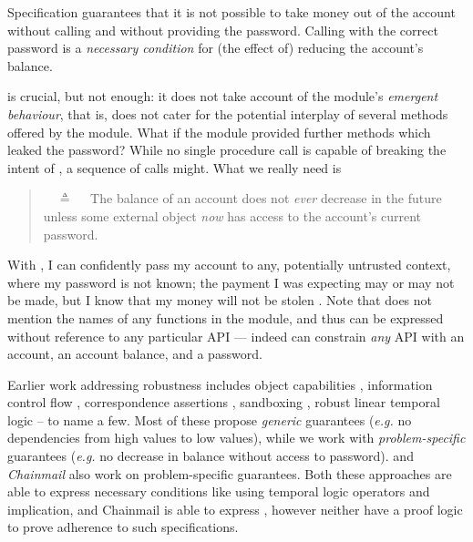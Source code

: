 Specification \SrobustA %
{guarantees} that it is not possible to  take money out of the account 
{without calling  and} without providing the password.
  Calling    with the  correct password is 
a \emph{necessary condition} for {(the effect of)} reducing the account's  balance.

\SrobustA is  crucial, but  not   enough:
it does not take  account of the module's \emph{emergent behaviour},
{that is, does not cater for the potential interplay of several methods offered by the module.}
 What if the module provided further methods which leaked the password?  
{ While no single procedure call is capable of breaking the intent of \SrobustA, a sequence of calls might.}
{What} we really need is
 \begin{quote}
\SrobustB\ \ $\triangleq$ \ \ The balance of an account does not {\emph{ever}} decrease in the future unless some external 
object  {\emph{now}} has access to the account's current password.
\end{quote}
With \SrobustB, I can confidently pass my account to  {any, potentially untrusted context, where my password is not known;} 
 {the payment I was expecting may or may not be made,}
but I know 
 {that my money will not be stolen} \cite{ooToSecurity}. 
 Note that \SrobustB  does not mention
 the names of any functions in the module, and 
 thus can be expressed without reference to any particular API ---
 indeed \SrobustB can constrain \emph{any} API with an account, an account
 balance, and a password.

 
{Earlier work addressing robustness} includes object capabilities  \cite{MillerPhD, dd, threoremsFreeSep}, 
information control flow \cite{Zdancewic:Myers:01,noninteferenceOS}, 
 correspondence assertions \cite{Maffeis:aiamb:thesis00},
 sandboxing  \cite{robustSafetyPatrignani,sandbox},
robust linear temporal logic   \cite{RLTL2022} -- to name a few. %
{Most of these  %
propose \emph{generic}  guarantees (\emph{e.g.} no dependencies from high values to low values),
while we work with  \emph{problem-specific} guarantees  (\emph{e.g.} no decrease in balance without access to password).}
{{{} \cite{VerX} and  \emph{Chainmail} \cite{FASE} also work on problem-specific guarantees.}
Both these approaches are able to express necessary conditions
  like \SrobustA using
  temporal logic operators and implication,
  and Chainmail is able to express \SrobustB,
  however neither have a proof logic
   to prove adherence to such specifications.}
%






